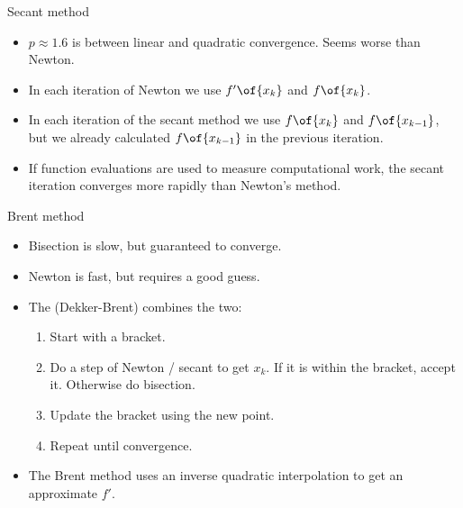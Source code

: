 \documentclass[11pt,xcolor={dvipsnames},aspectratio=159,hyperref={pdftex,pdfpagemode=UseNone,hidelinks,pdfdisplaydoctitle=true},usepdftitle=false]{beamer}
\begin{document}
\begin{frame}{Secant method}
    
    \begin{itemize}
        \item $p\approx 1.6$ is between linear and quadratic convergence. Seems worse than Newton.
        \item In each iteration of Newton we use $f'\of{x_k}$ and $f\of{x_k}$.
        \item In each iteration of the secant method we use $f\of{x_k}$ and $f\of{x_{k-1}}$, but we already calculated $f\of{x_{k-1}}$ in the previous iteration.
        \item If function evaluations are used to measure computational work, the secant iteration converges more rapidly than Newton's method.
    \end{itemize}
\end{frame}

\begin{frame}{Brent method}
    
    \begin{itemize}
        \item Bisection is slow, but guaranteed to converge.
        \item Newton is fast, but requires a good guess.
        \item The  (Dekker-Brent) combines the two: \begin{enumerate}
            \item Start with a bracket. 
            \item Do a step of Newton / secant to get $x_k$. If it is within the bracket, accept it. Otherwise do bisection.
            \item Update the bracket using the new point. 
            \item Repeat until convergence. 
        \end{enumerate}
        \item The Brent method uses an inverse quadratic interpolation to get an approximate $f'$.
    \end{itemize}
\end{frame}
\end{document}
